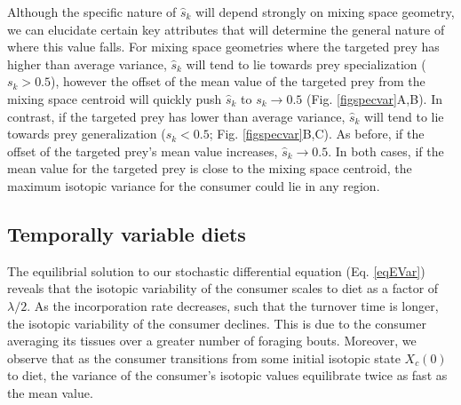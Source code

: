 \documentclass{article}
\begin{document}
Although the specific nature of $\hat s_k$ will depend strongly on mixing space geometry, we can elucidate certain key attributes that will determine the general nature of where this value falls.
For mixing space geometries where the targeted prey has higher than average variance, $\hat s_k$ will tend to lie towards prey specialization ($s_k>0.5$), however the offset of the mean value of the targeted prey from the mixing space centroid will quickly push $\hat s_k$ to $s_k \to 0.5$ (Fig. \ref{figspecvar}A,B).
In contrast, if the targeted prey has lower than average variance, $\hat s_k$ will tend to lie towards prey generalization ($s_k < 0.5$; Fig. \ref{figspecvar}B,C).
As before, if the offset of the targeted prey's mean value increases, $\hat s_k \to 0.5$.
In both cases, if the mean value for the targeted prey is close to the mixing space centroid, the maximum isotopic variance for the consumer could lie in any region.




\subsection*{Temporally variable diets}
The equilibrial solution to our stochastic differential equation (Eq. \ref{eqEVar}) reveals that the isotopic variability of the consumer scales to diet as a factor of $\lambda/2$.
As the incorporation rate decreases, such that the turnover time is longer, the isotopic variability of the consumer declines.
This is due to the consumer averaging its tissues over a greater number of foraging bouts.
Moreover, we observe that as the consumer transitions from some initial isotopic state $X_c(0)$ to diet, the variance of the consumer's isotopic values equilibrate twice as fast as the mean value.
\end{document}
